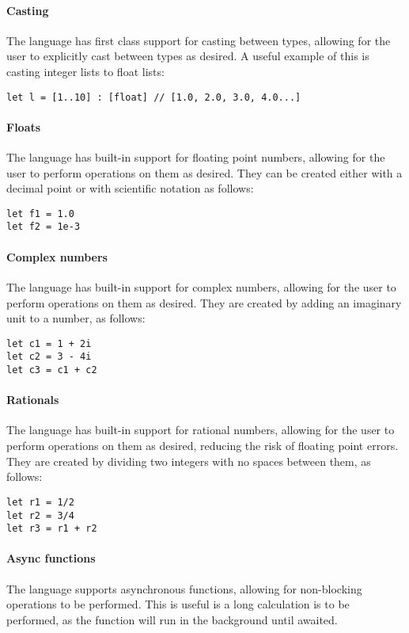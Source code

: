 \paragraph{Casting} The language has first class support for casting between types, allowing for the user to
explicitly cast between types as desired.
A useful example of this is casting integer lists to float lists:

\begin{verbatim}
let l = [1..10] : [float] // [1.0, 2.0, 3.0, 4.0...]
\end{verbatim}

\paragraph{Floats} The language has built-in support for floating point numbers, allowing for the user to perform
operations on them as desired.
They can be created either with a decimal point or with scientific notation as follows:

\begin{verbatim}
let f1 = 1.0
let f2 = 1e-3
\end{verbatim}

\paragraph{Complex numbers} The language has built-in support for complex numbers, allowing for the user to
perform operations on them as desired.
They are created by adding an imaginary unit to a number, as follows:

\begin{verbatim}
let c1 = 1 + 2i
let c2 = 3 - 4i
let c3 = c1 + c2
\end{verbatim}

\paragraph{Rationals} The language has built-in support for rational numbers, allowing for the user to perform
operations on them as desired, reducing the risk of floating point errors.
They are created by dividing two integers with no spaces between them, as follows:

\begin{verbatim}
let r1 = 1/2
let r2 = 3/4
let r3 = r1 + r2
\end{verbatim}



\paragraph{Async functions} The language supports asynchronous functions, allowing for non-blocking operations
to be performed.
This is useful is a long calculation is to be performed, as the function will run in the background until awaited.

